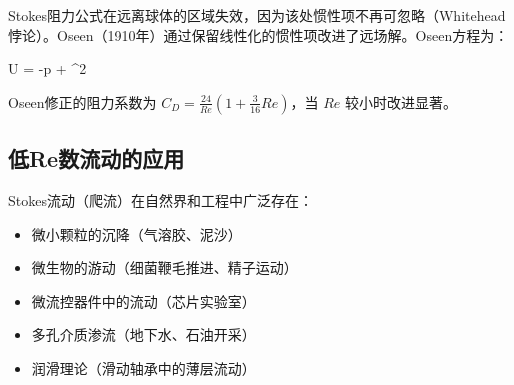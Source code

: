 Stokes阻力公式在远离球体的区域失效，因为该处惯性项不再可忽略（Whitehead悖论）。Oseen（1910年）通过保留线性化的惯性项改进了远场解。Oseen方程为：

\begin{myformula}
    \rho U = -\nabla p + \mu\nabla^{2}
\end{myformula}

Oseen修正的阻力系数为 $C_D = \frac{24}{Re}\left(1 + \frac{3}{16}Re\right)$，当 $Re$ 较小时改进显著。

\subsection{低Re数流动的应用}

Stokes流动（爬流）在自然界和工程中广泛存在：
\begin{itemize}
    \item 微小颗粒的沉降（气溶胶、泥沙）
    \item 微生物的游动（细菌鞭毛推进、精子运动）
    \item 微流控器件中的流动（芯片实验室）
    \item 多孔介质渗流（地下水、石油开采）
    \item 润滑理论（滑动轴承中的薄层流动）
\end{itemize}

